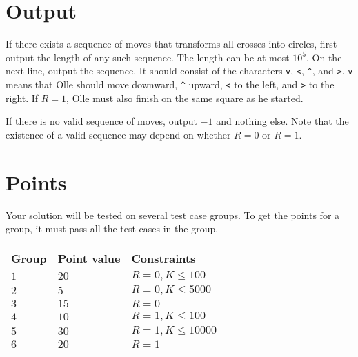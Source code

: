 \section*{Output}
If there exists a sequence of moves that transforms all crosses into circles, first output the length of any such sequence.
The length can be at most $10^5$. On the next line, output the sequence. It should consist of the characters
\verb|v|, \verb|<|, \verb|^|, and \verb|>|.
\verb|v| means that Olle should move downward, \verb|^| upward, \verb|<| to the left, and \verb|>| to the right.
If $R=1$, Olle must also finish on the same square as he started.

If there is no valid sequence of moves, output $-1$ and nothing else. Note that the existence of a valid sequence may
depend on whether $R=0$ or $R=1$.

\section*{Points}
Your solution will be tested on several test case groups.
To get the points for a group, it must pass all the test cases in the group.

\noindent
\begin{tabular}{| l | l | p{12cm} |}
  \hline
  \textbf{Group} & \textbf{Point value} & \textbf{Constraints} \\ \hline
  $1$    & $20$       & $R=0, K \leq 100$ \\ \hline
  $2$    & $5$        & $R=0, K \leq 5000$ \\ \hline
  $3$    & $15$       & $R=0$ \\ \hline
  $4$    & $10$       & $R=1, K \leq 100$ \\ \hline
  $5$    & $30$       & $R=1, K \leq 10000$ \\ \hline
  $6$    & $20$       & $R=1$ \\ \hline
\end{tabular}


